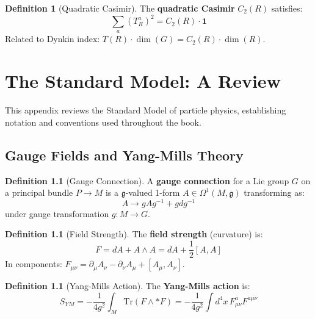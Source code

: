 \documentclass[11pt,a4paper,openright]{book}
\theoremstyle{plain}
\theoremstyle{definition}
\newtheorem{definition}[theorem]{Definition}
\newcommand{\Tr}{\mathrm{Tr}}
\newcommand{\g}{\mathfrak{g}}
\begin{document}
\begin{definition}[Quadratic Casimir]
The \textbf{quadratic Casimir} $C_2(R)$ satisfies:
\begin{equation}
\sum_a (T^a_R)^2 = C_2(R) \cdot \mathbf{1}
\end{equation}
Related to Dynkin index: $T(R) \cdot \dim(G) = C_2(R) \cdot \dim(R)$.
\end{definition}


\chapter{The Standard Model: A Review}
\label{app:sm}

This appendix reviews the Standard Model of particle physics, establishing notation and conventions used throughout the book.

\section{Gauge Fields and Yang-Mills Theory}

\begin{definition}[Gauge Connection]
A \textbf{gauge connection} for a Lie group $G$ on a principal bundle $P \to M$ is a $\g$-valued 1-form $A \in \Omega^1(M, \g)$ transforming as:
\begin{equation}
A \to g A g^{-1} + g dg^{-1}
\end{equation}
under gauge transformation $g: M \to G$.
\end{definition}

\begin{definition}[Field Strength]
The \textbf{field strength} (curvature) is:
\begin{equation}
F = dA + A \wedge A = dA + \frac{1}{2}[A, A]
\end{equation}
In components: $F_{\mu\nu} = \partial_\mu A_\nu - \partial_\nu A_\mu + [A_\mu, A_\nu]$.
\end{definition}

\begin{definition}[Yang-Mills Action]
The \textbf{Yang-Mills action} is:
\begin{equation}
S_{YM} = -\frac{1}{4g^2} \int_M \Tr(F \wedge *F) = -\frac{1}{4g^2} \int d^4x \, F^a_{\mu\nu} F^{a\mu\nu}
\end{equation}
\end{definition}
\end{document}

